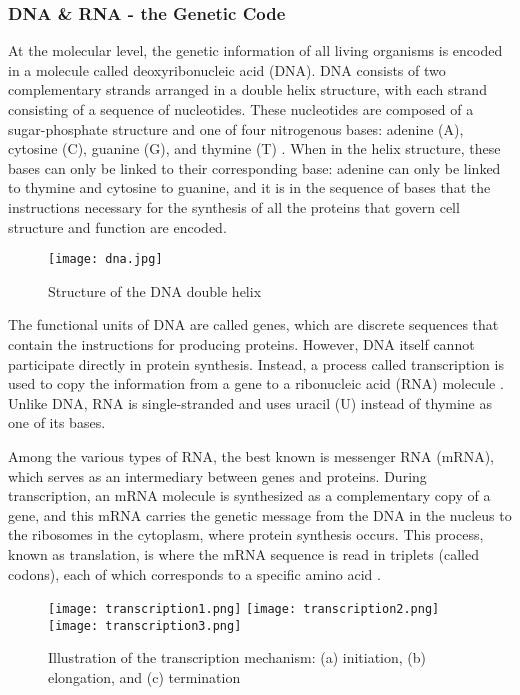 \subsubsection*{DNA \& RNA - the Genetic Code}

At the molecular level, the genetic information of all living organisms is encoded in a molecule called deoxyribonucleic acid (DNA). 
DNA consists of two complementary strands arranged in a double helix structure, with each strand consisting of a sequence of nucleotides. 
These nucleotides are composed of a sugar-phosphate structure and one of four nitrogenous bases: adenine (A), cytosine (C), guanine (G), 
and thymine (T) \cite{ConceptsBiology_DNA}. When in the helix structure, these bases can only be linked to their corresponding base: 
adenine can only be linked to thymine and cytosine to guanine, and it is in the sequence of bases that the instructions necessary for the 
synthesis of all the proteins that govern cell structure and function are encoded.
 
\begin{figure}[h]
\centering
\texttt{[image: dna.jpg]}
\caption{Structure of the DNA double helix}
\label{fig:dna}
\end{figure}

The functional units of DNA are called genes, which are discrete sequences that contain the instructions for producing proteins. However, 
DNA itself cannot participate directly in protein synthesis. Instead, a process called transcription is used to copy the information 
from a gene to a ribonucleic acid (RNA) molecule \cite{basic_biology_NCBI2002}. Unlike DNA, RNA is single-stranded and uses uracil (U) 
instead of thymine as one of its bases.

Among the various types of RNA, the best known is messenger RNA (mRNA), which serves as an intermediary between genes and proteins. 
During transcription, an mRNA molecule is synthesized as a complementary copy of a gene, and this mRNA carries the genetic message 
from the DNA in the nucleus to the ribosomes in the cytoplasm, where protein synthesis occurs. This process, known as translation, 
is where the mRNA sequence is read in triplets (called codons), each of which corresponds to a specific amino acid \cite{central_dogma_molecular}.

\begin{figure}[h]
\centering
\texttt{[image: transcription1.png]}
\texttt{[image: transcription2.png]}
\texttt{[image: transcription3.png]}
\caption{Illustration of the transcription mechanism: (a) initiation, (b) elongation, and (c) termination}
\label{fig:transcription}
\end{figure}

